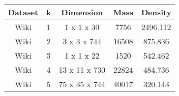 \begin{table}
\centering
\begin{tabular}{|c|c|c|c|c|}
    \hline
        Dataset & k & Dimension & Mass & Density \\
    \hline
        Wiki & 1 & 1 x 1 x 30 & 7756 & 2496.112 \\
    \hline
        Wiki & 2 & 3 x 3 x 744 & 16508 & 875.836 \\
    \hline
        Wiki & 3 & 1 x 1 x 22 & 1520 & 542.462 \\
    \hline
        Wiki & 4 & 13 x 11 x 730 & 22824 & 484.736 \\
    \hline
        Wiki & 5 & 75 x 35 x 744 & 40017 & 320.143 \\
    \hline
\end{tabular}
\end{table}